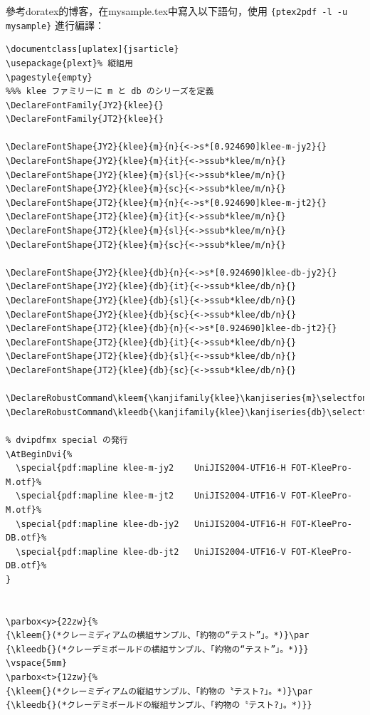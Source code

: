 \par{}參考{doratex}的博客，在{mysample.tex}中寫入以下語句，使用
{\color{red}\verb+{ptex2pdf -l -u  mysample}+}
進行編譯：
\begin{lstlisting}[firstnumber=1]
%#!使用uplatex 編譯
\documentclass[uplatex]{jsarticle}
\usepackage{plext}% 縦組用
\pagestyle{empty}
%%% klee ファミリーに m と db のシリーズを定義
\DeclareFontFamily{JY2}{klee}{}
\DeclareFontFamily{JT2}{klee}{}

\DeclareFontShape{JY2}{klee}{m}{n}{<->s*[0.924690]klee-m-jy2}{}
\DeclareFontShape{JY2}{klee}{m}{it}{<->ssub*klee/m/n}{}
\DeclareFontShape{JY2}{klee}{m}{sl}{<->ssub*klee/m/n}{}
\DeclareFontShape{JY2}{klee}{m}{sc}{<->ssub*klee/m/n}{}
\DeclareFontShape{JT2}{klee}{m}{n}{<->s*[0.924690]klee-m-jt2}{}
\DeclareFontShape{JT2}{klee}{m}{it}{<->ssub*klee/m/n}{}
\DeclareFontShape{JT2}{klee}{m}{sl}{<->ssub*klee/m/n}{}
\DeclareFontShape{JT2}{klee}{m}{sc}{<->ssub*klee/m/n}{}

\DeclareFontShape{JY2}{klee}{db}{n}{<->s*[0.924690]klee-db-jy2}{}
\DeclareFontShape{JY2}{klee}{db}{it}{<->ssub*klee/db/n}{}
\DeclareFontShape{JY2}{klee}{db}{sl}{<->ssub*klee/db/n}{}
\DeclareFontShape{JY2}{klee}{db}{sc}{<->ssub*klee/db/n}{}
\DeclareFontShape{JT2}{klee}{db}{n}{<->s*[0.924690]klee-db-jt2}{}
\DeclareFontShape{JT2}{klee}{db}{it}{<->ssub*klee/db/n}{}
\DeclareFontShape{JT2}{klee}{db}{sl}{<->ssub*klee/db/n}{}
\DeclareFontShape{JT2}{klee}{db}{sc}{<->ssub*klee/db/n}{}

\DeclareRobustCommand\kleem{\kanjifamily{klee}\kanjiseries{m}\selectfont}
\DeclareRobustCommand\kleedb{\kanjifamily{klee}\kanjiseries{db}\selectfont}

% dvipdfmx special の発行
\AtBeginDvi{%
  \special{pdf:mapline klee-m-jy2    UniJIS2004-UTF16-H FOT-KleePro-M.otf}%
  \special{pdf:mapline klee-m-jt2    UniJIS2004-UTF16-V FOT-KleePro-M.otf}%
  \special{pdf:mapline klee-db-jy2   UniJIS2004-UTF16-H FOT-KleePro-DB.otf}%
  \special{pdf:mapline klee-db-jt2   UniJIS2004-UTF16-V FOT-KleePro-DB.otf}%
}


\parbox<y>{22zw}{%
{\kleem{}(*クレーミディアムの横組サンプル、「約物の“テスト”」。*)}\par
{\kleedb{}(*クレーデミボールドの横組サンプル、「約物の“テスト”」。*)}}
\vspace{5mm}
\parbox<t>{12zw}{%
{\kleem{}(*クレーミディアムの縦組サンプル、「約物の〝テスト?」。*)}\par
{\kleedb{}(*クレーデミボールドの縦組サンプル、「約物の〝テスト?」。*)}}

\end{lstlisting}

